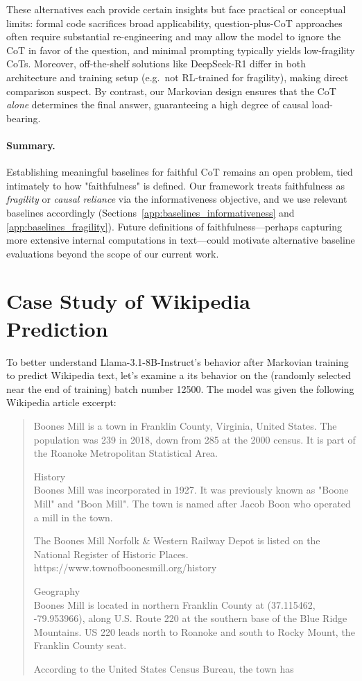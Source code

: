 \documentclass{article}
\begin{document}
These alternatives each provide certain insights but face practical or conceptual limits: formal code sacrifices broad applicability, question-plus-CoT approaches often require substantial re-engineering and may allow the model to ignore the CoT in favor of the question, and minimal prompting typically yields low-fragility CoTs. Moreover, off-the-shelf solutions like DeepSeek-R1 differ in both architecture and training setup (e.g.\ not RL-trained for fragility), making direct comparison suspect. By contrast, our Markovian design ensures that the CoT \emph{alone} determines the final answer, guaranteeing a high degree of causal load-bearing.

\paragraph{Summary.}
Establishing meaningful baselines for faithful CoT remains an open problem, tied intimately to how "faithfulness" is defined. Our framework treats faithfulness as \emph{fragility} or \emph{causal reliance} via the informativeness objective, and we use relevant baselines accordingly (Sections~\ref{app:baselines_informativeness} and \ref{app:baselines_fragility}). Future definitions of faithfulness---perhaps capturing more extensive internal computations in text---could motivate alternative baseline evaluations beyond the scope of our current work.

\section{Case Study of Wikipedia Prediction}
\label{app:case}

To better understand Llama-3.1-8B-Instruct's behavior after Markovian training to predict Wikipedia text, let's examine a its behavior on the (randomly selected near the end of training) batch number 12500. The model was given the following Wikipedia article excerpt:

\begin{quote}
Boones Mill is a town in Franklin County, Virginia, United States. The population was 239 in 2018, down from 285 at the 2000 census. It is part of the Roanoke Metropolitan Statistical Area.

History\\
Boones Mill was incorporated in 1927. It was previously known as "Boone Mill" and "Boon Mill". The town is named after Jacob Boon who operated a mill in the town.

The Boones Mill Norfolk \& Western Railway Depot is listed on the National Register of Historic Places.
https://www.townofboonesmill.org/history

Geography\\
Boones Mill is located in northern Franklin County at  (37.115462, -79.953966), along U.S. Route 220 at the southern base of the Blue Ridge Mountains. US 220 leads north  to Roanoke and south  to Rocky Mount, the Franklin County seat.

According to the United States Census Bureau, the town has
\end{quote}
\end{document}
